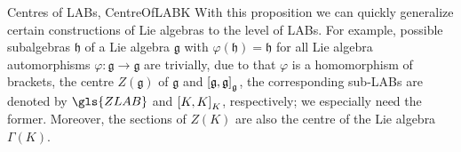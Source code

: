 \begin{examples}{Centres of LABs, \newline \cite[first parapgraph after Proposition 3.3.9; page 105]{mackenzieGeneralTheory}}{CentreOfLABK}
With this proposition we can quickly generalize certain constructions of Lie algebras to the level of LABs. For example, possible subalgebras $\mathfrak{h}$ of a Lie algebra $\mathfrak{g}$ with $\varphi(\mathfrak{h}) = \mathfrak{h}$ for all Lie algebra automorphisms $\varphi: \mathfrak{g} \to \mathfrak{g}$ are trivially, due to that $\varphi$ is a homomorphism of brackets, the centre $Z(\mathfrak{g})$ of $\mathfrak{g}$ and $\mleft[ \mathfrak{g}, \mathfrak{g} \mright]_{\mathfrak{g}}$, the corresponding sub-LABs are denoted by $\gls{ZLAB}$ and $\mleft[ K, K \mright]_K$, respectively; we especially need the former. Moreover, the sections of $Z(K)$ are also the centre of the Lie algebra $\Gamma(K)$.
\begin{center}
\end{center}
\end{examples}

